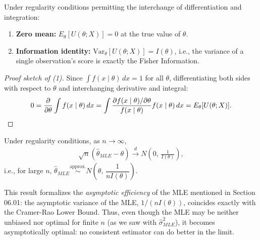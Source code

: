 \begin{propiedad}
	Under regularity conditions permitting the interchange of differentiation and integration:
	\begin{enumerate}
		\item \textbf{Zero mean:} $E_\theta[U(\theta;X)] = 0$ at the true value of $\theta$.
		\item \textbf{Information identity:} $\text{Var}_\theta[U(\theta;X)] = I(\theta)$, i.e., the variance of a single observation's score is exactly the Fisher Information.
	\end{enumerate}
\end{propiedad}

\begin{proof}[Proof sketch of (1)]
	Since $\int f(x\mid\theta)\,dx=1$ for all $\theta$, differentiating both sides with respect to $\theta$ and interchanging derivative and integral:
	\begin{align}
		0 = \frac{\partial}{\partial\theta}\int f(x\mid\theta)\,dx = \int \frac{\partial f(x\mid\theta)/\partial\theta}{f(x\mid\theta)} f(x\mid\theta)\,dx = E_\theta[U(\theta;X)]. \qedhere
	\end{align}
\end{proof}

\begin{teorema}
	 \label{eq:6.3.1}
	Under regularity conditions, as $n\to\infty$,
	\begin{align}
		\sqrt{n}\left(\hat\theta_{MLE} - \theta\right) \xrightarrow{d} N\!\left(0,\, \frac{1}{I(\theta)}\right),
	\end{align}
	i.e., for large $n$, $\hat\theta_{MLE} \overset{\text{approx.}}{\sim} N\!\left(\theta,\, \dfrac{1}{nI(\theta)}\right)$.
\end{teorema}

\begin{observacion}
	This result formalizes the \emph{asymptotic efficiency} of the MLE mentioned in Section 06.01: the asymptotic variance of the MLE, $1/(nI(\theta))$, coincides exactly with the Cramer-Rao Lower Bound. Thus, even though the MLE may be neither unbiased nor optimal for finite $n$ (as we saw with $\hat\sigma^2_{MLE}$), it becomes asymptotically optimal: no consistent estimator can do better in the limit.
\end{observacion}

